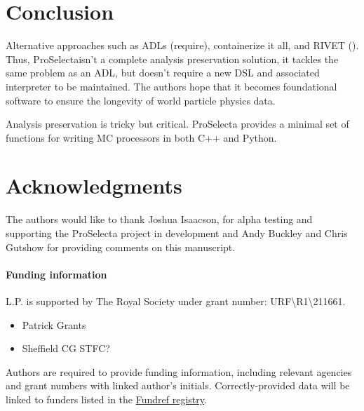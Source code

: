 \documentclass{SciPost}
\newcommand{\proselecta}{{\sc ProSelecta}}
\begin{document}
\section{Conclusion}
\label{sec:conc}

Alternative approaches such as ADLs (require), containerize it all, and RIVET (). Thus, \proselecta isn't a complete analysis preservation solution, it tackles the same problem as an ADL, but doesn't require a new DSL and associated interpreter to be maintained. The authors hope that it becomes foundational software to ensure the longevity of world particle physics data.

Analysis preservation is tricky but critical. \proselecta{} provides a minimal set of functions for writing MC processors in both C++ and Python.

\section*{Acknowledgments}
The authors would like to thank Joshua Isaacson, for alpha testing and supporting the \proselecta{} project in development and Andy Buckley and Chris Gutshow for providing comments on this manuscript.

\paragraph{Funding information}

L.P. is supported by The Royal Society under grant number: \newline{}URF\textbackslash{}R1\textbackslash{}211661.

\begin{itemize}
    \item Patrick Grants
    \item Sheffield CG STFC?
\end{itemize}
Authors are required to provide funding information, including relevant agencies and grant numbers with linked author's initials. Correctly-provided data will be linked to funders listed in the \href{https://www.crossref.org/services/funder-registry/}{\sf Fundref registry}.
\end{document}
